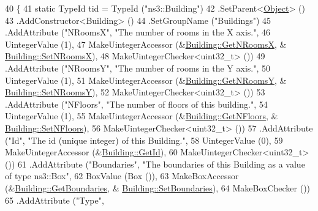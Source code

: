 \begin{DoxyCode}
40 \{
41   \textcolor{keyword}{static} TypeId tid = TypeId (\textcolor{stringliteral}{"ns3::Building"})
42     .SetParent<\hyperlink{classns3_1_1Object_a40860402e64d8008fb42329df7097cdb}{Object}> ()
43     .AddConstructor<Building> ()
44     .SetGroupName (\textcolor{stringliteral}{"Buildings"})
45     .AddAttribute (\textcolor{stringliteral}{"NRoomsX"}, \textcolor{stringliteral}{"The number of rooms in the X axis."},
46                    UintegerValue (1),
47                    MakeUintegerAccessor (&\hyperlink{classns3_1_1Building_a866a6c68adeb8a2c602aa669cb457a2a}{Building::GetNRoomsX}, &
      \hyperlink{classns3_1_1Building_a60eac680f1059fb9d883a659607e2fae}{Building::SetNRoomsX}),
48                    MakeUintegerChecker<uint32\_t> ())
49     .AddAttribute (\textcolor{stringliteral}{"NRoomsY"}, \textcolor{stringliteral}{"The number of rooms in the Y axis."},
50                    UintegerValue (1),
51                    MakeUintegerAccessor (&\hyperlink{classns3_1_1Building_a3d93ae744bbc1d99bb4c592fbf2db82c}{Building::GetNRoomsY}, &
      \hyperlink{classns3_1_1Building_a9103ee5b5edf013624d7e18422c4ba06}{Building::SetNRoomsY}),
52                    MakeUintegerChecker<uint32\_t> ())
53     .AddAttribute (\textcolor{stringliteral}{"NFloors"}, \textcolor{stringliteral}{"The number of floors of this building."},
54                    UintegerValue (1),
55                    MakeUintegerAccessor (&\hyperlink{classns3_1_1Building_a72d2b5dff06b32deef931ed23f9220f6}{Building::GetNFloors}, &
      \hyperlink{classns3_1_1Building_ae9f97075b5c8bf4685703e30ed049791}{Building::SetNFloors}),
56                    MakeUintegerChecker<uint32\_t> ())
57     .AddAttribute (\textcolor{stringliteral}{"Id"}, \textcolor{stringliteral}{"The id (unique integer) of this Building."},
58                    UintegerValue (0),
59                    MakeUintegerAccessor (&\hyperlink{classns3_1_1Building_a69aa3b91a01813b264d2feb405f541da}{Building::GetId}),
60                    MakeUintegerChecker<uint32\_t> ())
61     .AddAttribute (\textcolor{stringliteral}{"Boundaries"}, \textcolor{stringliteral}{"The boundaries of this Building as a value of type ns3::Box"},
62                    BoxValue (Box ()),
63                    MakeBoxAccessor (&\hyperlink{classns3_1_1Building_ace7276537dcf00cf61c4925e878c3c44}{Building::GetBoundaries}, &
      \hyperlink{classns3_1_1Building_a4b69659f05a983f06e33e7db62415915}{Building::SetBoundaries}),
64                    MakeBoxChecker ())
65     .AddAttribute (\textcolor{stringliteral}{"Type"},

\end{DoxyCode}
